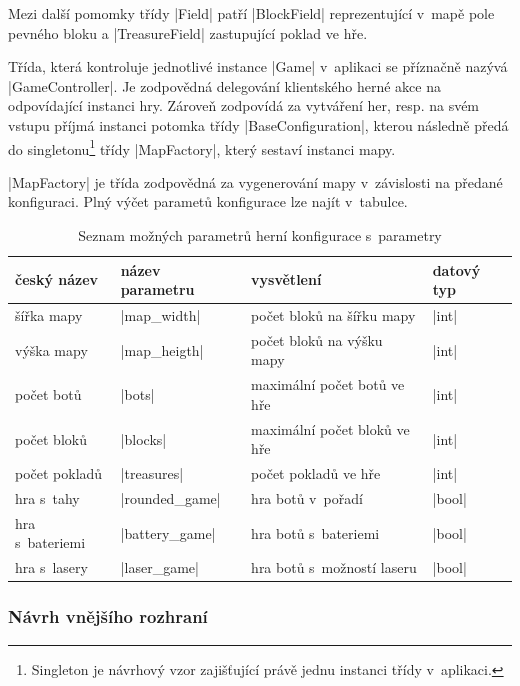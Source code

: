 Mezi další pomomky třídy \ic|Field| patří \ic|BlockField| reprezentující v~mapě pole pevného bloku a \ic|TreasureField| zastupující poklad ve hře.

Třída, která kontroluje jednotlivé instance \ic|Game| v~aplikaci se příznačně nazývá \ic|GameController|. Je zodpovědná delegování klientského herné akce na odpovídající instanci hry. Zároveň zodpovídá za vytváření her, resp. na svém vstupu příjmá instanci potomka třídy \ic|BaseConfiguration|, kterou následně předá do singletonu\footnote{Singleton je návrhový vzor zajišťující právě jednu instanci třídy v~aplikaci.} třídy \ic|MapFactory|, který sestaví instanci mapy.

\ic|MapFactory| je třída zodpovědná za vygenerování mapy v~závislosti na předané konfiguraci. Plný výčet parametů konfigurace lze najít v~tabulce.

\begin{table}[H]
	\caption{Seznam možných parametrů herní konfigurace s~parametry}
	\label{table:conf-parameters}
	\centering
	\begin{tabular}{ l | l | l | l }
		český název & název parametru & vysvětlení & datový typ \\
		\hline
		šířka mapy & \ic|map_width| & počet bloků na šířku mapy & \ic|int| \\
		výška mapy & \ic|map_heigth| & počet bloků na výšku mapy & \ic|int| \\
		počet botů & \ic|bots| & maximální počet botů ve hře & \ic|int| \\
		počet bloků & \ic|blocks| & maximální počet bloků ve hře & \ic|int| \\
		počet pokladů & \ic|treasures| & počet pokladů ve hře & \ic|int| \\
		hra s~tahy & \ic|rounded_game| & hra botů v~pořadí & \ic|bool| \\
		hra s~bateriemi & \ic|battery_game| & hra botů s~bateriemi & \ic|bool| \\
		hra s~lasery & \ic|laser_game| & hra botů s~možností laseru & \ic|bool| \\
	\end{tabular}
\end{table}

\subsubsection{Návrh vnějšího rozhraní}


